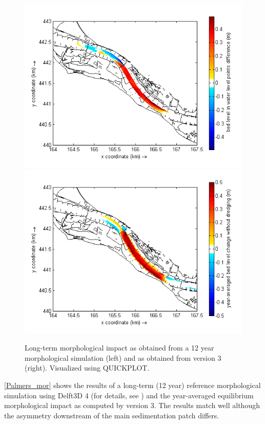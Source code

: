\begin{figure}
\includegraphics[width=\columnwidth/2]{figures/Palmerswaard_delft3d.png}
\includegraphics[width=\columnwidth/2]{figures/Palmerswaard_dfastmi.png}
\caption{Long-term morphological impact as obtained from a 12 year morphological simulation (left) and as obtained from \dfmi version 3 (right).
Visualized using QUICKPLOT.}
\label{Palmers_mor}
\end{figure}

\autoref{Palmers_mor} shows the results of a long-term (12 year) reference morphological simulation using Delft3D 4 (for details, see \citet{GiriJagers2022}) and the year-averaged equilibrium morphological impact as computed by \dfmi version 3.
The results match well although the asymmetry downstream of the main sedimentation patch differs.


